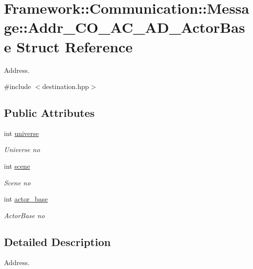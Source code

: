 \hypertarget{structFramework_1_1Communication_1_1Message_1_1Addr__CO__AC__AD__ActorBase}{
\section{Framework::Communication::Message::Addr\_\-CO\_\-AC\_\-AD\_\-ActorBase Struct Reference}
\label{structFramework_1_1Communication_1_1Message_1_1Addr__CO__AC__AD__ActorBase}
}


Address.  


{\ttfamily \#include $<$destination.hpp$>$}\subsection*{Public Attributes}
\begin{DoxyCompactItemize}
\item 
int \hyperlink{structFramework_1_1Communication_1_1Message_1_1Addr__CO__AC__AD__ActorBase_a9f3a5f278fc66d6275e619495ce4ccc6}{universe}
\begin{DoxyCompactList}\small\item\em Universe no \item\end{DoxyCompactList}\item 
int \hyperlink{structFramework_1_1Communication_1_1Message_1_1Addr__CO__AC__AD__ActorBase_a8818968c075199228003a97444b6b3a7}{scene}
\begin{DoxyCompactList}\small\item\em Scene no \item\end{DoxyCompactList}\item 
int \hyperlink{structFramework_1_1Communication_1_1Message_1_1Addr__CO__AC__AD__ActorBase_a54bdb7a14936ed694579f2711cc0a944}{actor\_\-base}
\begin{DoxyCompactList}\small\item\em ActorBase no \item\end{DoxyCompactList}\end{DoxyCompactItemize}


\subsection{Detailed Description}
Address. 


